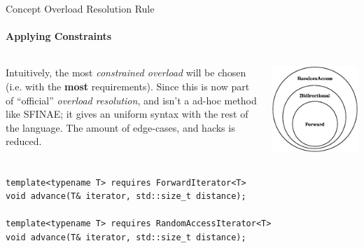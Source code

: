 \documentclass{beamer}
\begin{document}
    \begin{frame}[fragile]{Concept Overload Resolution Rule}
        \framesubtitle{Applying Constraints}
        \begin{columns}
            Intuitively, the most \emph{constrained overload} will be chosen (i.e. with the \textbf{most} requirements). Since this is now part of ``official'' \emph{overload resolution}, and isn't a ad-hoc method like SFINAE; it gives an uniform syntax with the rest of the language. The amount of edge-cases, and hacks is reduced.
            \vspace{-1.5em}
            \begin{center}
                \includegraphics[width=\textwidth]{figures/iterators.eps}
            \end{center}
        \end{columns}
        \begin{center}
        \begin{lstlisting}[caption={function overloading for \texttt{advance} based on type constraint.}]
template<typename T> requires ForwardIterator<T>
void advance(T& iterator, std::size_t distance);

template<typename T> requires RandomAccessIterator<T>
void advance(T& iterator, std::size_t distance); \end{lstlisting}
        \end{center}
    \end{frame}
\end{document}
